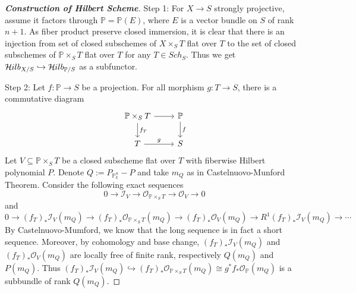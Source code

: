 \documentclass{ctexart}
\newcommand{\hilbertfunctor}{\mathcal{H}\kern -.5pt ilb}
\begin{document}
\begin{proof}[\textbf{\emph{Construction of Hilbert Scheme}}]
    Step 1: For $X \longrightarrow S$ strongly projective, assume it factors through $\mathbb{P} = \mathbb{P}(E)$,
    where $E$ is a vector bundle on $S$ of rank $n + 1$.
    As fiber product preserve closed immersion, it is clear that there is an injection from set of closed subschemes of $X \times_{S} T$ flat over $T$ to the set of closed subschemes of $\mathbb{P} \times_{S} T$ flat over $T$ for any $T\in Sch_{S}$.
    Thus we get $\hilbertfunctor_{X/S} \hookrightarrow \hilbertfunctor_{\mathbb{P}/S}$ as a subfunctor.
    \par
    Step 2: Let $f: \mathbb{P} \longrightarrow S$ be a projection.
    For all morphism $g: T \longrightarrow S$, there is a commutative diagram
    \begin{equation*}
        \begin{tikzcd}
            \mathbb{P} \times_{S} T \arrow[r] \arrow[d, "f_{T}"] &
            \mathbb{P} \arrow[d, "f"] \\
            T \arrow[r, "g"] &
            S
        \end{tikzcd}
    \end{equation*}
    Let $V \subseteq \mathbb{P} \times_{S} T$ be a closed subscheme flat over $T$ with fiberwise Hilbert polynomial $P$.
    Denote $Q := P_{\mathbb{P}_{k}^{n}} - P$ and take $m_{Q}$ as in Castelnuovo-Munford Theorem.
    Consider the following exact sequences
    \begin{equation*}
        0 \longrightarrow \mathcal{I}_{V} \longrightarrow \mathcal{O}_{\mathbb{P} \times_{S} T} \longrightarrow \mathcal{O}_{V} \longrightarrow 0
    \end{equation*}
    and 
    \begin{equation*}
        0 \longrightarrow (f_{T})_{\ast}\mathcal{I}_{V}(m_{Q}) \longrightarrow (f_{T})_{\ast}\mathcal{O}_{\mathbb{P} \times_{S} T}(m_{Q}) \longrightarrow (f_{T})_{\ast}\mathcal{O}_{V}(m_{Q}) \longrightarrow R^{1}(f_{T})_{\ast}\mathcal{I}_{V}(m_{Q}) \longrightarrow \cdots
    \end{equation*}
    By Castelnuovo-Mumford, we know that the long sequence is in fact a short sequence.
    Moreover, by cohomology and base change, $(f_{T})_{\ast}\mathcal{I}_{V}(m_{Q})$ and $(f_{T})_{\ast}\mathcal{O}_{V}(m_{Q})$ are locally free of finite rank, respectively $Q(m_{Q})$ and $P(m_{Q})$.
    Thus $(f_{T})_{\ast}\mathcal{I}_{V}(m_{Q}) \hookrightarrow (f_{T})_{\ast}\mathcal{O}_{\mathbb{P} \times_{S} T}(m_{Q}) \cong g^{\ast}f_{\ast}\mathcal{O}_{\mathbb{P}}(m_{Q})$ is a subbundle of rank $Q(m_{Q})$.

\end{proof}
\end{document}
